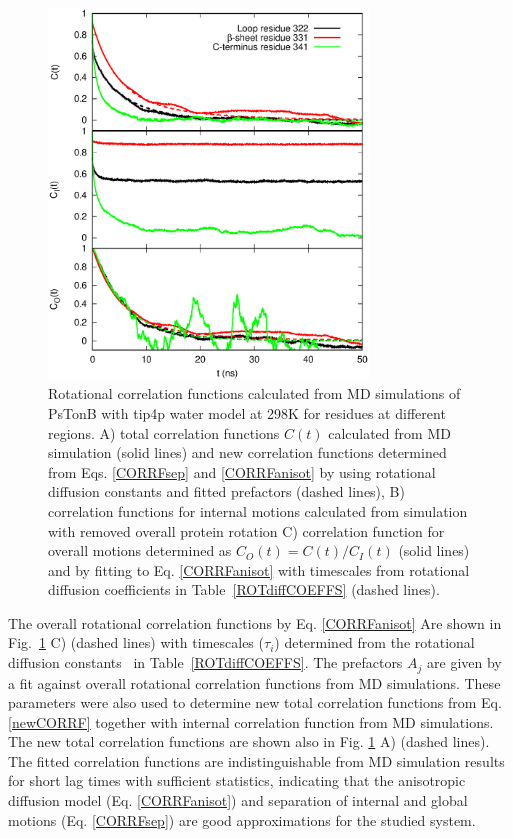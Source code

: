 \documentclass[pre,aps,floatfix,authordate1-4,twocolumn]{revtex4-1}
\begin{document}
\begin{figure}[!h]
  \includegraphics[width=8.5cm]{../Figs/exampleCORRF2.eps}%
  \caption{Rotational correlation functions calculated from MD simulations of PsTonB with tip4p water
    model at 298K for residues at different regions.
    A) total correlation functions $C(t)$ calculated from MD simulation (solid lines) and
    new correlation functions determined from Eqs. \ref{CORRFsep} and \ref{CORRFanisot} by
    using rotational diffusion constants and fitted prefactors (dashed lines),
    B) correlation functions for internal motions calculated from simulation with removed overall protein rotation
    C) correlation function for overall motions determined as $C_O(t)=C(t)/C_I(t)$ (solid lines) and by fitting
    to Eq. \ref{CORRFanisot} with timescales from rotational diffusion coefficients in Table~\ref{ROTdiffCOEFFS} (dashed lines).
    }\label{exampleCORRF}
\end{figure}

The overall rotational correlation functions by Eq. \ref{CORRFanisot}
Are shown in Fig.~\ref{exampleCORRF} C) (dashed lines) with timescales ($\tau_i$)
determined from the rotational diffusion constants~\cite{Note1} in Table~\ref{ROTdiffCOEFFS}.
The prefactors $A_j$ are given by a fit against overall rotational correlation functions from MD simulations.
These parameters were also used to determine new total correlation functions from Eq. \ref{newCORRF} 
together with internal correlation function from MD simulations.
The new total correlation functions are shown also in Fig. \ref{exampleCORRF} A) (dashed lines).
The fitted correlation functions are indistinguishable from MD simulation results
for short lag times with sufficient statistics,
indicating that the anisotropic diffusion model (Eq. \ref{CORRFanisot}) and
separation of internal and global motions (Eq. \ref{CORRFsep}) are
good approximations for the studied system.
\end{document}
